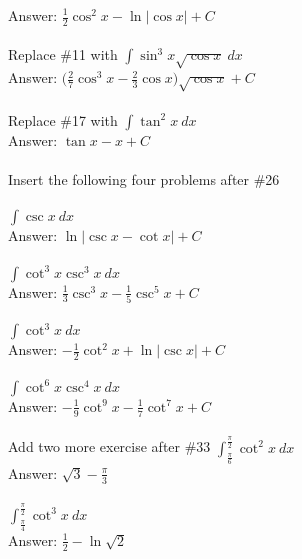 \documentclass[11pt]{report}
\begin{document}
Answer: $\frac{1}{2}\cos^2 x - \ln |\cos x| + C$\\ \\

Replace \#11 with $\int \sin^3 x \sqrt {\cos x} ~dx$\\

Answer: $\bigl(\frac{2}{7} \cos^3 x - \frac{2}{3} \cos x\bigr) \sqrt {\cos x} + C$\\ \\

Replace \#17 with $\int \tan^2 x~dx$\\

Answer: $\tan x - x +  C$\\ \\

Insert the following four problems after \#26\\ \\

$\int \csc x~dx$\\

Answer: $\ln |\csc x - \cot x| +  C$\\ \\

$\int \cot^3 x \csc^3 x~dx$\\

Answer: $\frac{1}{3} \csc^3 x - \frac{1}{5} \csc^5 x +  C$\\ \\

$\int \cot^3 x~dx$\\

Answer: $-\frac{1}{2} \cot^2 x + \ln |\csc x|+  C$\\ \\

$\int \cot^6 x \csc^4 x~dx$\\

Answer: $-\frac{1}{9} \cot^9 x - \frac{1}{7} \cot^7 x +  C$\\ \\

Add two more exercise after \#33 $\displaystyle \int_{\frac{\pi}{6}}^{\frac{\pi}{2}} \cot^2 x~dx$\\

Answer: $\sqrt 3 - \frac{\pi}{3}$\\ \\

$\displaystyle \int_{\frac{\pi}{4}}^{\frac{\pi}{2}} \cot^3 x~dx$\\

Answer: $\frac{1}{2}-\ln \sqrt 2$\\ \\
\end{document}
